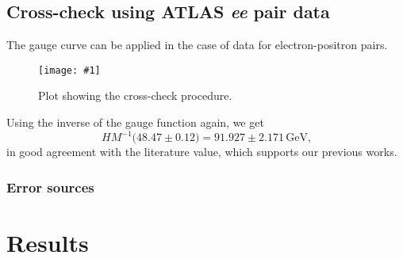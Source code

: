 \documentclass[twocolumn]{article}
\newcommand{\insertFigure}[1]{%
   \texttt{[image: \#1]}%
}
\begin{document}
\subsection{Cross-check using ATLAS \textit{ee} pair data}
The gauge curve can be applied in the case of data for electron-positron pairs. 
\begin{figure}
\centering
\insertFigure{Images/ZeeCheck.png}
\caption{Plot showing the cross-check procedure.}
\label{fig:crosscheck}
\end{figure}
Using the inverse of the gauge function again, we get
\begin{equation}
HM^{-1} \big(48.47 \pm 0.12\big) = 91.927 \pm 2.171 \, \text{GeV,}
\end{equation}
in good agreement with the literature value, which supports our previous works.
\subsubsection{Error sources}

\section{Results}
\end{document}
